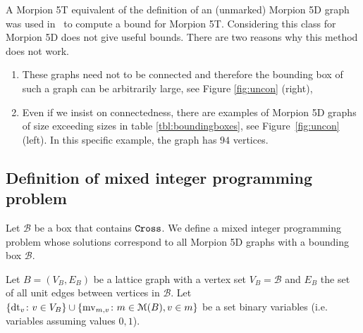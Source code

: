 \begin{remark}
%
A Morpion 5T equivalent of the definition of an (unmarked) Morpion 5D graph was 
  used in~\cite{ijcai} to compute a bound for Morpion 5T.
Considering this class for Morpion 5D  does not give useful bounds. There are two reasons why this method does not work.
\begin{enumerate}
\item These graphs need not to be connected and therefore the bounding box of such a graph
  can be arbitrarily large, see Figure \ref{fig:uncon} (right), 
\item Even if we insist on connectedness, there are examples of Morpion 5D graphs of size exceeding sizes in 
table \ref{tbl:boundingboxes}, see Figure~\ref{fig:uncon} (left). In this specific example, the graph has $94$ vertices.
\end{enumerate}
\end{remark}

\subsection{Definition of mixed integer programming problem}

Let $\mathcal{B}$ be a box that contains $\texttt{Cross}$. 
We define a mixed integer programming problem whose solutions correspond to all Morpion 5D graphs with a bounding 
   box $\mathcal{B}$.
  
\begin{definition}  
  \label{def:mip}
  Let $B = (V_B, E_B)$ be a lattice graph with a vertex set $V_B = \mathcal{B}$ and $E_B$ the set of all unit edges between vertices in ${\mathcal B}$. %
 Let $ \{ \operatorname{dt}_v \colon v \in V_B \} \cup \{ \operatorname{mv}_{m, v} \colon m \in \mathcal{M}(B), v \in m \}$ be a set  binary variables (i.e. variables assuming values $0, 1$).
\end{definition}
 

